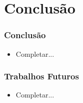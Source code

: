 \section[Conclusão]{Conclusão}

\begin{frame}
  \frametitle{Conclusão}
  \begin{itemize}
    \item Completar...
  \end{itemize}
\end{frame}

\begin{frame}
  \frametitle{Trabalhos Futuros}
  \begin{itemize}
    \item Completar...
  \end{itemize}
\end{frame}